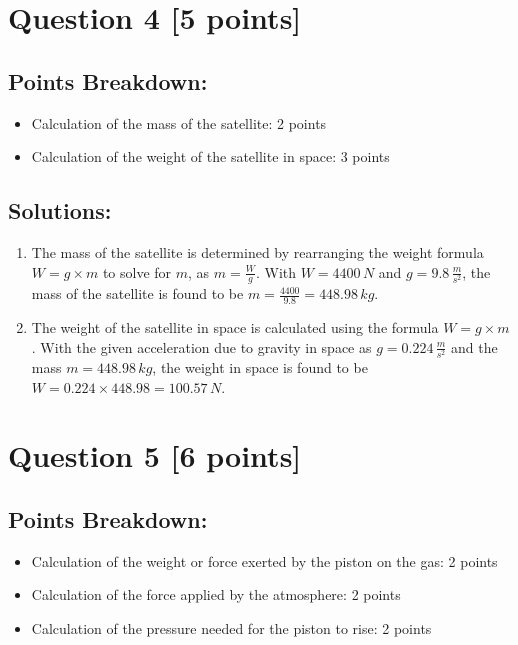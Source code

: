 \documentclass[12pt]{article}
\begin{document}
\newpage
\section*{Question 4 [5 points]}
\subsection*{Points Breakdown:}
\begin{itemize}
    \item Calculation of the mass of the satellite: 2 points
    \item Calculation of the weight of the satellite in space: 3 points
\end{itemize}

\subsection*{Solutions:}
\begin{enumerate}
    \item The mass of the satellite is determined by rearranging the weight formula \( W = g \times m \) to solve for \( m \), as \( m = \frac{W}{g} \). With \( W = 4400\, N \) and \( g = 9.8\, \frac{m}{s^2} \), the mass of the satellite is found to be \( m = \frac{4400}{9.8} = 448.98\, kg \).
    \item The weight of the satellite in space is calculated using the formula \( W = g \times m \). With the given acceleration due to gravity in space as \( g = 0.224\, \frac{m}{s^2} \) and the mass \( m = 448.98\, kg \), the weight in space is found to be \( W = 0.224 \times 448.98 = 100.57\, N \).
\end{enumerate}

\newpage
\section*{Question 5 [6 points]}
\subsection*{Points Breakdown:}
\begin{itemize}
    \item Calculation of the weight or force exerted by the piston on the gas: 2 points
    \item Calculation of the force applied by the atmosphere: 2 points
    \item Calculation of the pressure needed for the piston to rise: 2 points
\end{itemize}
\end{document}
